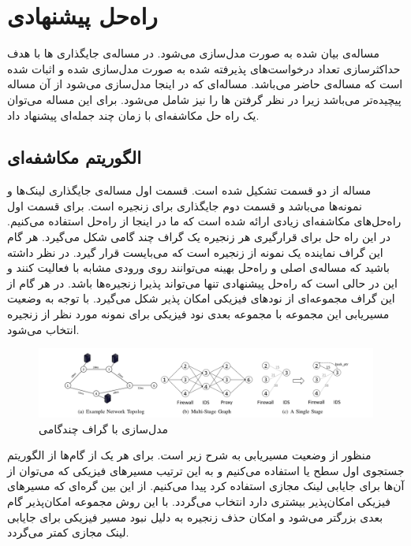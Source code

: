 
\chapter{راه‌حل پیشنهادی}

مساله‌ی بیان شده به صورت 
مدل‌سازی می‌شود.
در \cite{Eramo2016}
مساله‌ی جایگذاری ها با هدف حداکثرسازی تعداد درخواست‌های پذیرفته شده
به صورت  مدل‌سازی شده و اثبات شده است که مساله‌ی حاضر  می‌باشد.
مساله‌ای که در اینجا مدل‌سازی می‌شود از آن مساله پیچیده‌تر می‌باشد زیرا در نظر گرفتن ها را نیز شامل می‌شود.
برای این مساله می‌توان
یک راه حل مکاشفه‌ای با زمان چند جمله‌ای
پیشنهاد داد.

\section{الگوریتم مکاشفه‌ای}

مساله از دو قسمت تشکیل شده است. قسمت اول مساله‌ی جایگذاری لینک‌ها و نمونه‌ها می‌باشد
و قسمت دوم جایگذاری
برای زنجیره است.
برای قسمت اول راه‌حل‌های مکاشفه‌ای زیادی ارائه شده است که ما در اینجا
از راه‌حل \cite{Bari2015} استفاده می‌کنیم.
در این راه حل برای قرارگیری هر زنجیره یک گراف چند گامی شکل می‌گیرد.
هر گام این گراف نماینده یک نمونه از زنجیره است که می‌بایست قرار گیرد.
در نظر داشته باشید که مساله‌ی اصلی و راه‌حل بهینه می‌توانند روی ورودی مشابه با 
فعالیت کنند و این در حالی است که راه‌حل پیشنهادی تنها می‌تواند پذیرا زنجیره‌ها باشد.
در هر گام از این گراف مجموعه‌ای از نودهای فیزیکی امکان پذیر شکل می‌گیرد.
با توجه به وضعیت مسیریابی این مجموعه با مجموعه بعدی نود فیزیکی برای نمونه مورد نظر از زنجیره انتخاب می‌شود.

\begin{figure}[h]
\center\includegraphics[scale=.45]{images/bari}
\caption{مدل‌سازی با گراف چندگامی \cite{Bari2015}}
\label{fig.5}
\end{figure}

منظور از وضعیت مسیریابی به شرح زیر است. برای هر یک از گام‌ها از الگوریتم جستجوی اول سطح یا
استفاده می‌کنیم
و به این ترتیب مسیرهای فیزیکی که می‌توان از آن‌ها برای جایابی لینک مجازی استفاده کرد پیدا می‌کنیم.
از این بین گره‌ای که مسیرهای فیزیکی امکان‌پذیر بیشتری دارد انتخاب می‌گردد.
با این روش مجموعه امکان‌پذیر گام بعدی بزرگتر می‌شود و امکان حذف زنجیره به دلیل نبود مسیر فیزیکی
برای جایابی لینک مجازی کمتر می‌گردد.

